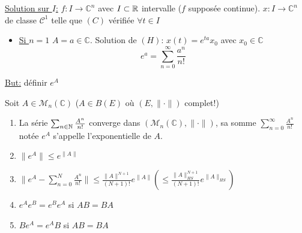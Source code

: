 \underline{Solution sur $I$:} $f: I \to \mathbb{C}^n$ avec $I \subset \mathbb{R}$ intervalle ($f$ supposée continue). $x: I \to  \mathbb{C}^n$ de classe $\mathcal{C}^1$ telle que  $(C)$ vérifiée  $\forall t \in I$
\begin{itemize}
    \item  \underline{Si $n=1$} $A = a \in  \mathbb{C}$. Solution de $(H)$:  $x(t) = e^{ta}x_0$ avec $x_0 \in \mathbb{C}$ 
        \[
            e^{a} = \sum_{n=0}^{\infty} \frac{a^n}{n!}
        \] 
\end{itemize}
\underline{But:} définir $e^A$
 \begin{theorem}
     Soit $A \in \mathcal{M}_n(\mathbb{C})$ ($A \in B(E)$ où $(E, \| \cdot \|)$ complet!)
     \begin{enumerate}
         \item La série $\sum_{n \in \mathbb{N}}^{} \frac{A^n}{n!}$ converge dans $(\mathcal{M}_n(\mathbb{C}), \| \cdot \|)$, sa somme  $\sum_{n=0}^{\infty} \frac{A^n}{n!}$ notée $e^A$ s'appelle l'exponentielle de  $A$.
         \item  $\|e^A\| \le e^{\|A\|}$
         \item $\|e^A - \sum_{n=0}^{N} \frac{A^n}{n!}\| \le \frac{\|A\|^{N+1}}{(N+1)!}e^{\|A\|} (\le \frac{\|A\|_{HS}^{N+1}}{(N+1)!}e^{\|A\|_{HS}})$ 
         \item $e^Ae^B = e^Be^A$ si  $AB=BA$
         \item  $Be^A = e^AB$ si  $AB=BA$
     \end{enumerate}
\end{theorem}
